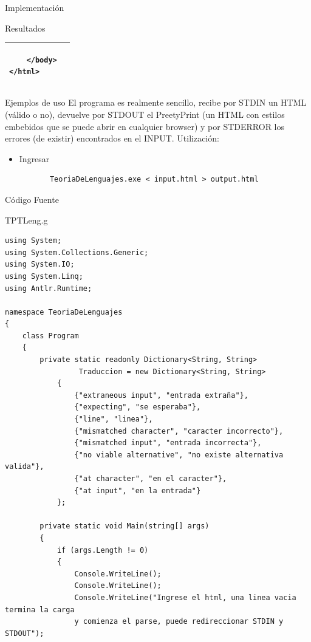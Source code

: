 \documentclass[a4paper,8pt]{article}
\begin{document}
\begin{section}{Implementación}
\begin{subsection}{Resultados}
\begin{tabular}{|p{6.5cm}|p{6.5cm}|}
{\begin{verbatim}
    </body>
</html>\end{verbatim}}\\
\hline

\end{tabular}

\end{subsection}
\begin{subsection}{Ejemplos de uso}
El programa es realmente sencillo, recibe por STDIN un HTML (válido o no), devuelve por STDOUT el PreetyPrint (un HTML con estilos embebidos que se puede abrir en cualquier browser) y por STDERROR los errores (de existir) encontrados en el INPUT.
Utilización:\\
\begin{itemize}
 \item Ingresar
  \begin{verbatim}
       TeoriaDeLenguajes.exe < input.html > output.html
  \end{verbatim}

\end{itemize}


\end{subsection}
\begin{subsection}{Código Fuente}
\begin{subsubsection}{TPTLeng.g}
 \begin{verbatim}
using System;
using System.Collections.Generic;
using System.IO;
using System.Linq;
using Antlr.Runtime;

namespace TeoriaDeLenguajes
{
    class Program
    {
        private static readonly Dictionary<String, String> 
                 Traduccion = new Dictionary<String, String>
            {
                {"extraneous input", "entrada extraña"},
                {"expecting", "se esperaba"},
                {"line", "linea"},
                {"mismatched character", "caracter incorrecto"},
                {"mismatched input", "entrada incorrecta"},
                {"no viable alternative", "no existe alternativa valida"},
                {"at character", "en el caracter"},
                {"at input", "en la entrada"}
            };

        private static void Main(string[] args)
        {
            if (args.Length != 0)
            {
                Console.WriteLine();
                Console.WriteLine();
                Console.WriteLine("Ingrese el html, una linea vacia termina la carga
                y comienza el parse, puede redireccionar STDIN y STDOUT");
                

\end{verbatim}
\end{subsubsection}
\end{subsection}
\end{section}
\end{document}
